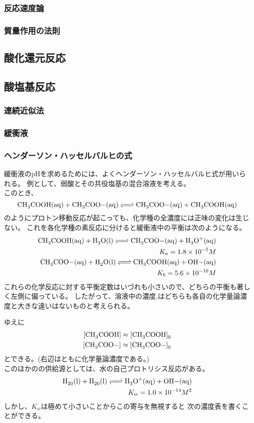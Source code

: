 \documentclass[dvipdfmx,uplatex]{jsarticle}
\begin{document}
	\subsubsection{反応速度論}
	\subsubsection{質量作用の法則}

\subsection{酸化還元反応}
\subsection{酸塩基反応}
	\subsubsection{連続近似法}
	\subsubsection{緩衝液}
	\subsubsection{ヘンダーソン・ハッセルバルヒの式}
緩衝液のpHを求めるためには、よくヘンダーソン・ハッセルバルヒ式が用いられる。
例として、弱酸とその共役塩基の混合溶液を考える。 \\
このとき、
\[
\ce{CH3COOH(aq) + CH3COO-(aq) <=> CH3COO-(aq) + CH3COOH(aq)}
\]
のようにプロトン移動反応が起こっても、化学種の全濃度には正味の変化は生じない。
これを各化学種の素反応に分けると緩衝液中の平衡は次のようになる。
\begin{align*}
\ce{CH3COOH(aq) + H2O(l) <=> CH3COO-(aq) + H3O+(aq)} \\
K_a = 1.8 \times 10^{-5} M \\
\ce{CH3COO-(aq) + H2O(l) <=> CH3COOH(aq) + OH-(aq)} \\
K_b = 5.6 \times 10^{-10} M
\end{align*}
これらの化学反応に対する平衡定数はいづれも小さいので、どちらの平衡も著しく左側に偏っている。
したがって、溶液中の濃度\ce{[CH3COOH]},\ce{[CH3COO-]}はどちらも各自の化学量論濃度と大きな違いはないものと考えられる。

ゆえに
\begin{align*}
\ce{[CH3COOH] \approx [CH3COOH]0} \\
\ce{[CH3COO-] \approx [CH3COO-]0} \\
\end{align*}
とできる。(右辺はともに化学量論濃度である。) \\
このほかのの供給源としては、水の自己プロトリシス反応がある。 \\
\begin{align*}
\ce{H20(l) + H20(l) <=> H3O+(aq) + OH-(aq)} \\
K_w = 1.0 \times 10^{-14} M^2 \\
\end{align*}
しかし、$K_w$は極めて小さいことからこの寄与を無視すると
次の濃度表を書くことができる。 \\
\end{document}
